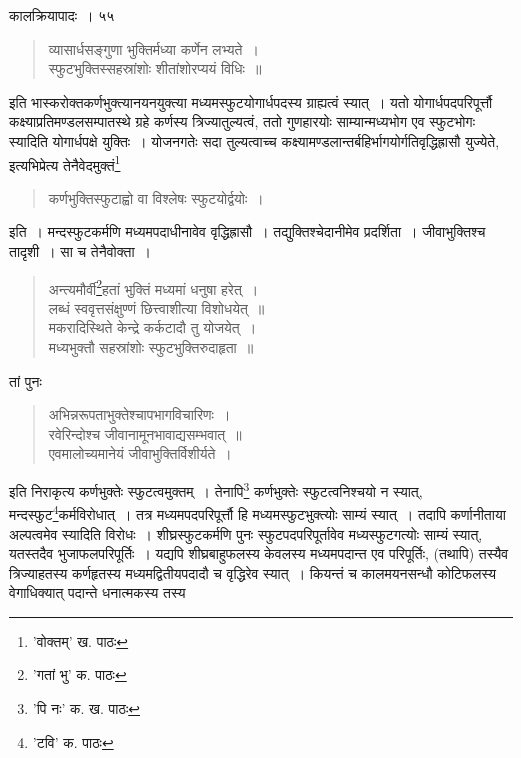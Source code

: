 \documentclass[11pt, openany]{book}
\begin{document}
{{{{{\newpage

\vspace{3cm} \hspace{4cm}कालक्रियापादः~। \hspace{4cm}५५ 

\vspace{0.3cm}
\begin{quote}
{\qt व्यासार्धसङ्गुणा भुक्तिर्मध्या कर्णेन लभ्यते~।\\
स्फुटभुक्तिस्सहस्रांशोः शीतांशोरप्ययं विधिः~॥}
\end{quote}

\noindent इति भास्करोक्तकर्णभुक्त्यानयनयुक्त्या मध्यमस्फुटयोगार्धपदस्य ग्राह्यत्वं स्यात्~। यतो योगार्धपदपरिपूर्त्तौ कक्ष्याप्रतिमण्डलसम्पातस्थे ग्रहे कर्णस्य त्रिज्यातुल्यत्वं, ततो गुणहारयोः साम्यान्मध्यभोग एव स्फुटभोगः स्यादिति योगार्धपक्षे युक्तिः~। योजनगतेः सदा तुल्यत्वाच्च कक्ष्यामण्डलान्तर्बहिर्भागयोर्गतिवृद्धिह्रासौ युज्येते, इत्यभिप्रेत्य तेनैवेदमुक्तं\renewcommand{\thefootnote}{१}\footnote{'वोक्तम्' ख. पाठः}\textendash 

\begin{quote}
{\qt कर्णभुक्तिस्फुटाह्वो वा विश्लेषः स्फुटयोर्द्वयोः~।}
\end{quote} 

\noindent इति~। मन्दस्फुटकर्मणि मध्यमपदाधीनावेव वृद्धिह्रासौ~। तद्युक्तिश्चेदानीमेव प्रदर्शिता~। जीवाभुक्तिश्च तादृशी~। सा च तेनैवोक्ता~। 

\begin{quote} 
{\qt अन्त्यमौर्वी\renewcommand{\thefootnote}{२}\footnote{'गतां भु' क. पाठः}हतां भुक्तिं मध्यमां धनुषा हरेत्~। \\
लब्धं स्ववृत्तसंक्षुण्णं छित्त्वाशीत्या विशोधयेत्~॥\\
मकरादिस्थिते केन्द्रे कर्कटादौ तु योजयेत्~।\\
मध्यभुक्तौ सहस्रांशोः स्फुटभुक्तिरुदाहृता~॥}
\end{quote}

\noindent तां पुनः\textendash 

\begin{quote}
{\qt अभिन्नरूपताभुक्तेश्चापभागविचारिणः~।\\
रवेरिन्दोश्च जीवानामूनभावाद्यसम्भवात्~॥\\
एवमालोच्यमानेयं जीवाभुक्तिर्विशीर्यते~।}
\end{quote}

\noindent इति निराकृत्य कर्णभुक्तेः स्फुटत्वमुक्तम्~। तेनापि\renewcommand{\thefootnote}{३}\footnote{'पि नः' क. ख. पाठः} कर्णभुक्तेः स्फुटत्वनिश्चयो न स्यात्, मन्दस्फुट\renewcommand{\thefootnote}{४}\footnote{'टवि' क. पाठः}कर्मविरोधात्~। तत्र मध्यमपदपरिपूर्त्तौ हि मध्यमस्फुटभुक्त्योः साम्यं स्यात्~। तदापि कर्णानीताया अल्पत्वमेव स्यादिति विरोधः~। शीघ्रस्फुटकर्मणि पुनः स्फुटपदपरिपूर्तावेव मध्यस्फुटगत्योः साम्यं स्यात्, यतस्तदैव भुजाफलपरिपूर्तिः~। यद्यपि शीघ्रबाहुफलस्य केवलस्य मध्यमपदान्त एव परिपूर्तिः, (तथापि) तस्यैव त्रिज्याहतस्य कर्णहृतस्य मध्यमद्वितीयपदादौ च वृद्धिरेव स्यात्~। कियन्तं च कालमयनसन्धौ कोटिफलस्य वेगाधिक्यात् पदान्ते धनात्मकस्य तस्य

}}}}}
\end{document}
